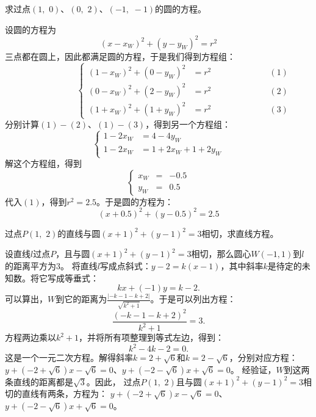 \documentclass[12pt,UTF8]{ctexbook}
\begin{document}
\begin{et}
    求过点$(1, \,\, 0)$、$(0, \,\, 2)$、$(-1, \,\, -1)$的圆的方程。
\end{et}
\begin{so}
    设圆的方程为
    $$(x - x_W)^2 + (y - y_W)^2 = r^2$$
    三点都在圆上，因此都满足圆的方程，于是我们得到方程组：
    $$
    \qquad\qquad\qquad \left\{
    \begin{array}{llr}
        (1 - x_W)^2 + (0 - y_W)^2 &= r^2 &\qquad\qquad\qquad (1) \\
        (0 - x_W)^2 + (2 - y_W)^2 &= r^2 &\qquad\qquad\qquad (2) \\
        (1 + x_W)^2 + (1 + y_W)^2 &= r^2 &\qquad\qquad\qquad (3)
    \end{array}
    \right.
    $$
    分别计算$(1) - (2)$、$(1) - (3)$，得到另一个方程组：
    $$
    \left\{
    \begin{array}{ll}
        1 - 2x_W &= 4 - 4y_W \\
        1 - 2x_W &= 1 + 2x_W + 1 + 2y_W 
    \end{array}
    \right.
    $$  
    解这个方程组，得到
    $$
    \left\{
    \begin{array}{clr}
        x_W &=& -0.5 \\
        y_W &=& 0.5
    \end{array}
    \right.
    $$  
    代入$(1)$，得到$r^2 = 2.5$。于是圆的方程为：
    $$(x + 0.5)^2 + (y - 0.5)^2 = 2.5$$
\end{so}

\begin{et}
    过点$P(1, \,\, 2)$的直线与圆$(x + 1)^2 + (y - 1)^2 = 3$相切，求直线方程。
\end{et}
\begin{so}
设直线$l$过点$P$，且与圆$(x + 1)^2 + (y - 1)^2 = 3$相切，那么圆心$W(-1, 1)$到$l$的距离平方为$3$。
将直线$l$写成点斜式：$y - 2 = k(x - 1) $，其中斜率$k$是待定的未知数。将它写成等垂式：
$$kx + (-1)y = k - 2. $$
可以算出，$W$到它的距离为$\frac{|- k - 1 - k + 2|}{\sqrt{k^2 + 1}}$。于是可以列出方程：
$$\frac{(- k - 1 - k + 2)^2}{k^2 + 1} = 3.$$
方程两边乘以$k^2 + 1$，并将所有项整理到等式左边，得到：
$$ k^2 - 4k - 2 = 0.$$
这是一个一元二次方程。解得斜率$k = 2 + \sqrt{6}$和$k = 2 - \sqrt{6}$，分别对应方程：
$y + (- 2 + \sqrt{6}) x - \sqrt{6} = 0$、$y + (- 2 - \sqrt{6}) x + \sqrt{6} = 0$。
经验证，$W$到这两条直线的距离都是$\sqrt{3}$。因此，
过点$P(1, \,\, 2)$且与圆$(x + 1)^2 + (y - 1)^2 = 3$相切的直线有两条，方程为：
$y + (- 2 + \sqrt{6}) x - \sqrt{6} = 0$、$y + (- 2 - \sqrt{6}) x + \sqrt{6} = 0$。    
\end{so}
\end{document}
